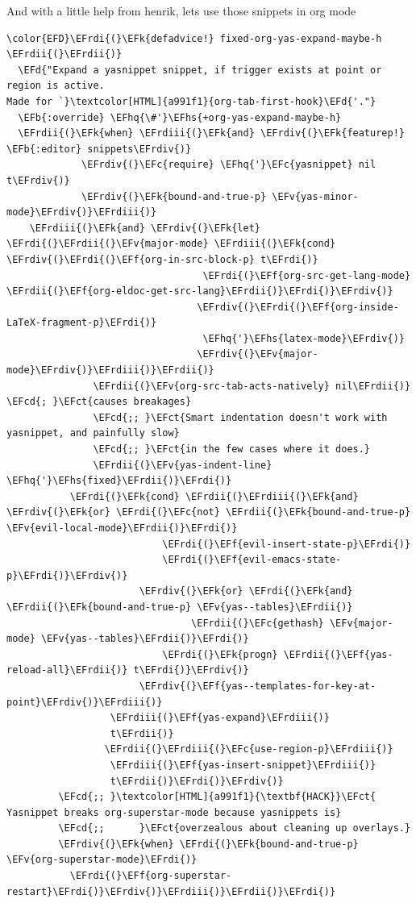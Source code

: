 \documentclass{scrartcl}
\newcommand{\EFk}[1]{\textcolor{EFk}{#1}} %
\newcommand{\EFd}[1]{\textcolor{EFd}{#1}} %
\newcommand{\EFb}[1]{\textcolor{EFb}{#1}} %
\newcommand{\EFct}[1]{\textcolor{EFct}{#1}} %
\newcommand{\EFc}[1]{\textcolor{EFc}{#1}} %
\newcommand{\EFv}[1]{\textcolor{EFv}{#1}} %
\newcommand{\EFf}[1]{\textcolor{EFf}{#1}} %
\newcommand{\EFcd}[1]{\textcolor{EFcd}{#1}} %
\newcommand{\EFhq}[1]{#1} %
\newcommand{\EFhs}[1]{#1} %
\newcommand{\EFrdi}[1]{#1} %
\newcommand{\EFrdii}[1]{#1} %
\newcommand{\EFrdiii}[1]{#1} %
\newcommand{\EFrdiv}[1]{#1} %
\begin{document}
And with a little help from henrik, lets use those snippets in org mode
\begin{Code}
\begin{Verbatim}[]
\color{EFD}\EFrdi{(}\EFk{defadvice!} fixed-org-yas-expand-maybe-h \EFrdii{(}\EFrdii{)}
  \EFd{"Expand a yasnippet snippet, if trigger exists at point or region is active.
Made for `}\textcolor[HTML]{a991f1}{org-tab-first-hook}\EFd{'."}
  \EFb{:override} \EFhq{\#'}\EFhs{+org-yas-expand-maybe-h}
  \EFrdii{(}\EFk{when} \EFrdiii{(}\EFk{and} \EFrdiv{(}\EFk{featurep!} \EFb{:editor} snippets\EFrdiv{)}
             \EFrdiv{(}\EFc{require} \EFhq{'}\EFc{yasnippet} nil t\EFrdiv{)}
             \EFrdiv{(}\EFk{bound-and-true-p} \EFv{yas-minor-mode}\EFrdiv{)}\EFrdiii{)}
    \EFrdiii{(}\EFk{and} \EFrdiv{(}\EFk{let} \EFrdi{(}\EFrdii{(}\EFv{major-mode} \EFrdiii{(}\EFk{cond} \EFrdiv{(}\EFrdi{(}\EFf{org-in-src-block-p} t\EFrdi{)}
                                  \EFrdi{(}\EFf{org-src-get-lang-mode} \EFrdii{(}\EFf{org-eldoc-get-src-lang}\EFrdii{)}\EFrdi{)}\EFrdiv{)}
                                 \EFrdiv{(}\EFrdi{(}\EFf{org-inside-LaTeX-fragment-p}\EFrdi{)}
                                  \EFhq{'}\EFhs{latex-mode}\EFrdiv{)}
                                 \EFrdiv{(}\EFv{major-mode}\EFrdiv{)}\EFrdiii{)}\EFrdii{)}
               \EFrdii{(}\EFv{org-src-tab-acts-natively} nil\EFrdii{)} \EFcd{; }\EFct{causes breakages}
               \EFcd{;; }\EFct{Smart indentation doesn't work with yasnippet, and painfully slow}
               \EFcd{;; }\EFct{in the few cases where it does.}
               \EFrdii{(}\EFv{yas-indent-line} \EFhq{'}\EFhs{fixed}\EFrdii{)}\EFrdi{)}
           \EFrdi{(}\EFk{cond} \EFrdii{(}\EFrdiii{(}\EFk{and} \EFrdiv{(}\EFk{or} \EFrdi{(}\EFc{not} \EFrdii{(}\EFk{bound-and-true-p} \EFv{evil-local-mode}\EFrdii{)}\EFrdi{)}
                           \EFrdi{(}\EFf{evil-insert-state-p}\EFrdi{)}
                           \EFrdi{(}\EFf{evil-emacs-state-p}\EFrdi{)}\EFrdiv{)}
                       \EFrdiv{(}\EFk{or} \EFrdi{(}\EFk{and} \EFrdii{(}\EFk{bound-and-true-p} \EFv{yas--tables}\EFrdii{)}
                                \EFrdii{(}\EFc{gethash} \EFv{major-mode} \EFv{yas--tables}\EFrdii{)}\EFrdi{)}
                           \EFrdi{(}\EFk{progn} \EFrdii{(}\EFf{yas-reload-all}\EFrdii{)} t\EFrdi{)}\EFrdiv{)}
                       \EFrdiv{(}\EFf{yas--templates-for-key-at-point}\EFrdiv{)}\EFrdiii{)}
                  \EFrdiii{(}\EFf{yas-expand}\EFrdiii{)}
                  t\EFrdii{)}
                 \EFrdii{(}\EFrdiii{(}\EFc{use-region-p}\EFrdiii{)}
                  \EFrdiii{(}\EFf{yas-insert-snippet}\EFrdiii{)}
                  t\EFrdii{)}\EFrdi{)}\EFrdiv{)}
         \EFcd{;; }\textcolor[HTML]{a991f1}{\textbf{HACK}}\EFct{ Yasnippet breaks org-superstar-mode because yasnippets is}
         \EFcd{;;      }\EFct{overzealous about cleaning up overlays.}
         \EFrdiv{(}\EFk{when} \EFrdi{(}\EFk{bound-and-true-p} \EFv{org-superstar-mode}\EFrdi{)}
           \EFrdi{(}\EFf{org-superstar-restart}\EFrdi{)}\EFrdiv{)}\EFrdiii{)}\EFrdii{)}\EFrdi{)}
\end{Verbatim}
\end{Code}
\end{document}
